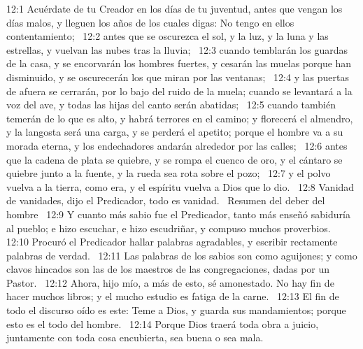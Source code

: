 12:1 Acuérdate de tu Creador en los días de tu juventud, antes que vengan los días malos, y lleguen los años de los cuales digas: No tengo en ellos contentamiento;  
12:2 antes que se oscurezca el sol, y la luz, y la luna y las estrellas, y vuelvan las nubes tras la lluvia;  
12:3 cuando temblarán los guardas de la casa, y se encorvarán los hombres fuertes, y cesarán las muelas porque han disminuido, y se oscurecerán los que miran por las ventanas;  
12:4 y las puertas de afuera se cerrarán, por lo bajo del ruido de la muela; cuando se levantará a la voz del ave, y todas las hijas del canto serán abatidas;  
12:5 cuando también temerán de lo que es alto, y habrá terrores en el camino; y florecerá el almendro, y la langosta será una carga, y se perderá el apetito; porque el hombre va a su morada eterna, y los endechadores andarán alrededor por las calles;  
12:6 antes que la cadena de plata se quiebre, y se rompa el cuenco de oro, y el cántaro se quiebre junto a la fuente, y la rueda sea rota sobre el pozo;  
12:7 y el polvo vuelva a la tierra, como era, y el espíritu vuelva a Dios que lo dio.  
12:8 Vanidad de vanidades, dijo el Predicador, todo es vanidad.  
Resumen del deber del hombre  
12:9 Y cuanto más sabio fue el Predicador, tanto más enseñó sabiduría al pueblo; e hizo escuchar, e hizo escudriñar, y compuso muchos proverbios.  
12:10 Procuró el Predicador hallar palabras agradables, y escribir rectamente palabras de verdad.  
12:11 Las palabras de los sabios son como aguijones; y como clavos hincados son las de los maestros de las congregaciones, dadas por un Pastor.  
12:12 Ahora, hijo mío, a más de esto, sé amonestado. No hay fin de hacer muchos libros; y el mucho estudio es fatiga de la carne.  
12:13 El fin de todo el discurso oído es este: Teme a Dios, y guarda sus mandamientos; porque esto es el todo del hombre.  
12:14 Porque Dios traerá toda obra a juicio, juntamente con toda cosa encubierta, sea buena o sea mala.
